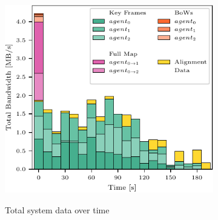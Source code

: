 \begin{figure}[h]
    \centering
    \begin{subfigure}[b]{0.55\linewidth}
        \centering
         {
            \includegraphics[width=\linewidth, valign=t]{figures/apr11_mh_trajectory_b_bandwith.pdf}
        }
        \caption{Total system data over time}
    \end{subfigure}%
    ~
    \begin{subfigure}[b]{0.45\linewidth}
        \flushright
\end{subfigure}
\end{figure}
